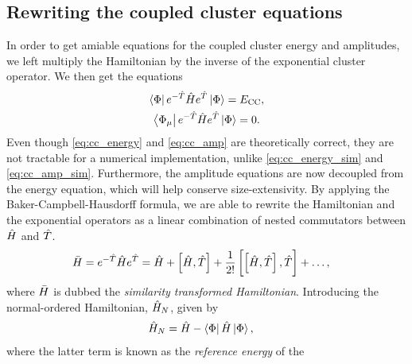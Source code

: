         \subsection{Rewriting the coupled cluster equations}
            In order to get amiable equations for the coupled cluster energy and
            amplitudes, we left multiply the Hamiltonian by the inverse of the
            exponential cluster operator.
            We then get the equations
            \begin{gather}
                \bra{\Phi} e^{-\hat{T}} \hat{H} e^{\hat{T}} \ket{\Phi}
                = E_{\text{CC}},
                \label{eq:cc_energy_sim}
                \\
                \bra{\Phi_{\mu}} e^{-\hat{T}} \hat{H} e^{\hat{T}} \ket{\Phi}
                = 0.
                \label{eq:cc_amp_sim}
            \end{gather}
            Even though \autoref{eq:cc_energy} and \autoref{eq:cc_amp} are
            theoretically correct, they are not tractable for a numerical
            implementation, unlike \autoref{eq:cc_energy_sim} and
            \autoref{eq:cc_amp_sim}.
            Furthermore, the amplitude equations are
            now decoupled from the energy equation, which will help conserve
            size-extensivity.
            By applying the Baker-Campbell-Hausdorff formula, we are able to
            rewrite the Hamiltonian and the exponential operators as a linear
            combination of nested commutators between $\hat{H}$ and $\hat{T}$.
            \begin{align}
                \bar{H}
                &=
                e^{-\hat{T}} \hat{H} e^{\hat{T}}
                =
                \hat{H}
                + \left[\hat{H}, \hat{T}\right]
                + \frac{1}{2!}\left[
                    \left[
                        \hat{H}
                    , 
                        \hat{T}
                    \right]
                , 
                    \hat{T}
                \right]
                + \dots,
            \end{align}
            where $\bar{H}$ is dubbed the \emph{similarity transformed
            Hamiltonian}.
            Introducing the normal-ordered Hamiltonian, $\hat{H}_N$, given by
            \begin{align}
                \hat{H}_N
                &= \hat{H} - \bra{\Phi}\hat{H}\ket{\Phi},
            \end{align}
            where the latter term is known as the \emph{reference energy} of the
